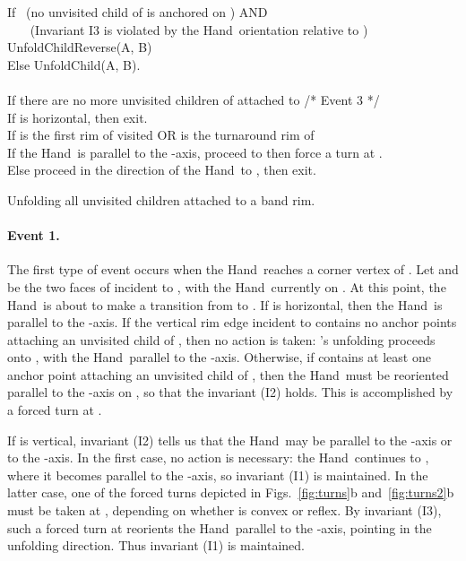 \documentclass[11pt]{article}
\newcommand\hand{{\sc Hand}}
\newcommand\unfold{{\sc UnfoldChild}}
\newcommand\unfoldrev{{\sc UnfoldChildReverse}}
\begin{document}
\begin{table}[hptb]
\begin{center}
{\begin{minipage}[h]{0.85\linewidth}
{\begin{tabbing}
\>\>\> If ~(no unvisited child of  is anchored on ) AND \\
\>\>\> ~~~ (Invariant I3 is violated by the \hand\ orientation relative to ) \\
\>\>\>\> \unfoldrev(A, B) \\
\>\>\> Else \unfold(A, B). \\
\\
\>If there are no more unvisited children of  attached to  /* Event 3 */\\
\>\> If  is horizontal, then exit. \\
\>\> If  is the first rim of  visited OR  is the turnaround rim of   \\
\>\> \> If the \hand\ is parallel to the -axis, proceed to  then force a turn at . \\
\>\> \> Else proceed in the direction of the \hand\ to , then exit.
\end{tabbing}}
\end{minipage}
}\vspace{1mm}
\end{center}
\vspace{-1em}\caption{Unfolding all unvisited children attached to a band rim.}
\label{tab:rimunfold}
\end{table}

\paragraph{Event 1.} The first type of event occurs when the \hand\ reaches a corner vertex  of . Let  and  be the two faces of  incident to , with the \hand\ currently on . At this point, the \hand\ is about to make a transition from  to . 
If  is horizontal, then the \hand\ is parallel to the -axis. If the vertical rim edge  incident to  contains no anchor points attaching an unvisited child of , then no action is taken: 's unfolding proceeds onto , with the \hand\ parallel to the -axis.
Otherwise, if  contains at least one anchor point attaching an unvisited child of , then the \hand\ must be reoriented parallel to the -axis on , so that the invariant (I2) holds. This is accomplished by a forced turn at .


If  is vertical, invariant (I2) tells us that the \hand\ may be parallel to the -axis or to the -axis. In the first case, no action is necessary: the \hand\ continues to , where it becomes parallel to the -axis, so invariant (I1) is maintained.
In the latter case, one of the forced turns depicted in Figs.~\ref{fig:turns}b and~\ref{fig:turns2}b must be taken at , depending on whether  is convex or reflex. By invariant (I3), such a forced turn at  reorients the \hand\ parallel to the -axis, pointing in the unfolding direction. Thus invariant (I1) is maintained.
\end{document}
